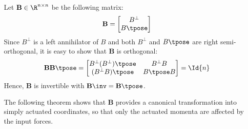 Let \(\mathbf{B} \in \R^{n\times n}\) be the following matrix:
\[
    \mathbf{B} = 
    \begin{bmatrix}
        B^\perp \\
        B\tpose \\
    \end{bmatrix}
\]
Since \(B^\perp\) is a left annihilator of \(B\) and both \(B^\perp\) and
\(B\tpose\) are right semi-orthogonal, it is easy to show that \(\mathbf{B}\) is
orthogonal:
\[
    \mathbf{B}\mathbf{B}\tpose = 
    \begin{bmatrix}
        B^\perp (B^\perp)\tpose & B^\perp B \\
        (B^\perp B)\tpose & B\tpose B
    \end{bmatrix} = \Id{n}
\]
Hence, \(\mathbf{B}\) is invertible with \(\mathbf{B}\inv = \mathbf{B}\tpose\).

The following theorem shows that \(\mathbf{B}\) provides a canonical
transformation into simply actuated coordinates, so that only the actuated momenta
are affected by the input forces.

